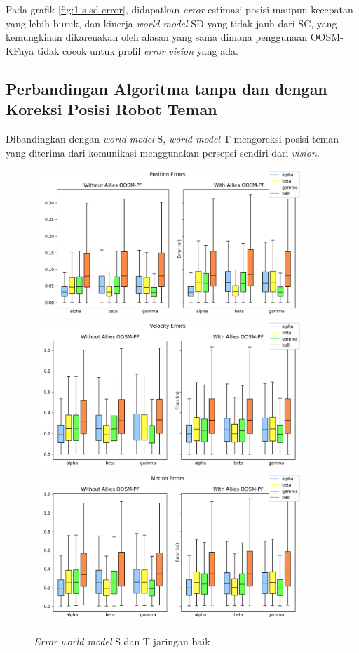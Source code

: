 Pada grafik \ref{fig:1-s-sd-error}, didapatkan \textit{error} estimasi posisi maupun kecepatan yang lebih buruk, dan kinerja \textit{world model} SD yang tidak jauh dari SC, yang kemungkinan dikarenakan oleh alasan yang sama dimana penggunaan OOSM-KFnya tidak cocok untuk profil \textit{error} \textit{vision} yang ada.

\subsection{Perbandingan Algoritma tanpa dan dengan Koreksi Posisi Robot Teman}

Dibandingkan dengan \textit{world model} S, \textit{world model} T mengoreksi posisi teman yang diterima dari komunikasi menggunakan persepsi sendiri dari \textit{vision}.

\begin{figure}[p]
    \centering
    \medskip
    \includegraphics[width=0.9\textwidth]{resources/cfg1_AS_AT_error_pos.png}
    \includegraphics[width=0.9\textwidth]{resources/cfg1_AS_AT_error_vel.png}
    \includegraphics[width=0.9\textwidth]{resources/cfg1_AS_AT_error_motion.png}
    \caption{\textit{Error} \textit{world model} S dan T jaringan baik}
    \label{fig:1-s-t-error}
    \bigskip
\end{figure}

